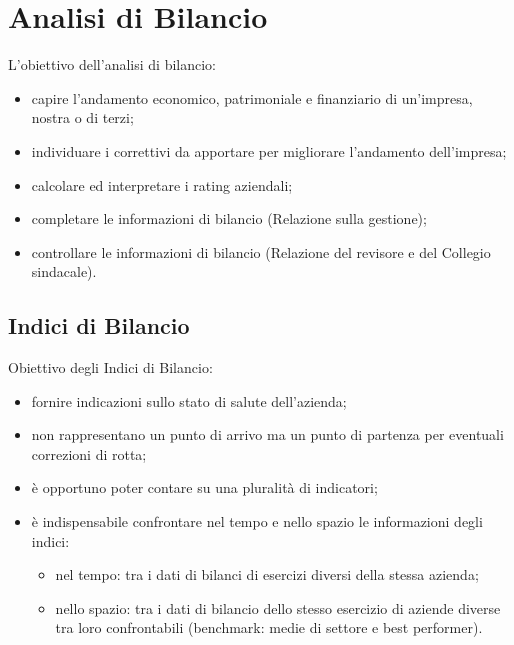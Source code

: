 \documentclass{article}
\begin{document}
\section{Analisi di Bilancio}
L’obiettivo dell’analisi di bilancio:
\begin{itemize}
    \item capire l’andamento economico, patrimoniale e finanziario di un’impresa, nostra o di terzi;
    \item individuare i correttivi da apportare per migliorare l’andamento dell’impresa;
    \item calcolare ed interpretare i rating aziendali;
    \item completare le informazioni di bilancio (Relazione sulla gestione);
    \item controllare le informazioni di bilancio (Relazione del revisore e del Collegio sindacale).
\end{itemize}



\subsection{Indici di Bilancio}
Obiettivo degli Indici di Bilancio:
\begin{itemize}
    \item fornire indicazioni sullo stato di salute dell’azienda;
    \item non rappresentano un punto di arrivo ma un punto di partenza per eventuali correzioni di rotta;
    \item è opportuno poter contare su una pluralità di indicatori;
    \item è indispensabile confrontare nel tempo e nello spazio le informazioni degli indici:
    \begin{itemize}
        \item nel tempo: tra i dati di bilanci di esercizi diversi della stessa azienda;
        \item nello spazio: tra i dati di bilancio dello stesso esercizio di aziende diverse tra loro
        confrontabili (benchmark: medie di settore e best performer).
    \end{itemize}
\end{itemize}
\end{document}
